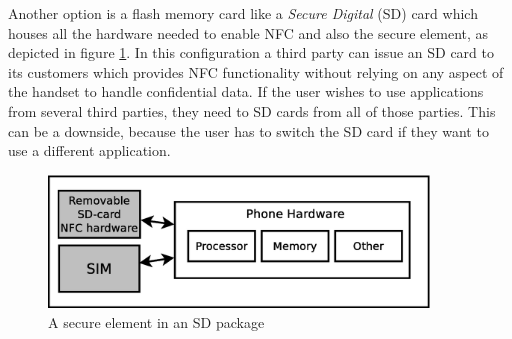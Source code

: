 \begin{enumerate}
\begin{item}
Another option is a flash memory card like a \textit{Secure Digital} (SD) card which houses all the hardware needed to enable NFC and also the secure element, as depicted in figure \ref{fig:modular_se}.
In this configuration a third party can issue an SD card to its customers which provides NFC functionality without relying on any aspect of the handset to handle confidential data. If the user wishes to use applications from several third parties, they need to SD cards from all of those parties. This can be a downside, because the user has to switch the SD card if they want to use a different application.
\begin{figure}
\includegraphics[width=0.9\textwidth]{images/SD_NFC}
\caption[SE in SD package]
{
A secure element in an SD package
}
\label{fig:modular_se}
\end{figure}
\end{item}


\end{enumerate}

